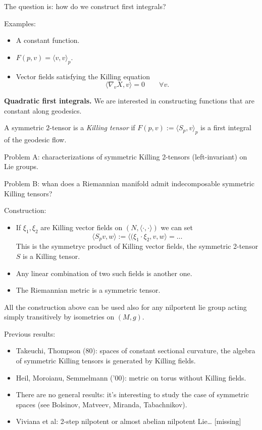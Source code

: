 \noindent
The question is: how do we construct
first integrals?

Examples:
\begin{itemize}
\item A constant function.
\item  $F(p,v)=\langle v,v\rangle_p$.
\item Vector fields satisfying the Killing
equation
$$
\langle\nabla_v X,v\rangle=0
\qquad \forall v.
$$
\end{itemize}

\medskip\noindent
{\bf Quadratic first integrals.}
We are interested in constructing functions
that are constant along geodesics.

\begin{definition}
\label{definition-killing-tensor}
A symmetric $2$-tensor is a {\it Killing
tensor} if $F(p,v):=\langle S_p,v\rangle_p$
is a first integral of the geodesic flow.
\end{definition}

\noindent
Problem A: characterizations of symmetric
Killing 2-tensors (left-invariant) on Lie
groups.

\medskip\noindent
Problem B: whan does a Riemannian manifold
admit indecomposable symmetric Killing
tensors?

\medskip\noindent
Construction:
\begin{itemize}
\item If $\xi_1,\xi_2$ are Killing vector
fields on $(N,\langle\cdot,\cdot\rangle)$
we can set
$$
\langle S_pv,w\rangle:=
\langle(\xi_1\cdot\xi_2,v,w\rangle
=…
$$
This is the symmetryc product of Killing
vector fields, the symmetric 2-tensor $S$ is
a Killing tensor.

\item Any linear combination of two such
fields is another one.

\item The Riemannian metric is a symmetric
tensor.
\end{itemize}

\medskip\noindent
All the construction above
can be used also for any
nilportent lie group acting simply
transitively by isometries on $(M,g)$.

Previous results:
\begin{itemize}
\item Takeuchi, Thompson (80):
spaces of constant sectional curvature, the
algebra of symmetric Killing tensors is
generated by Killing fields.
\item Heil, Moroianu, Semmelmann ('00):
metric on torus without Killing fields.
\item There are no general results:
it's interesting to study the case of
symmetric spaces (see Bolsinov, Matveev,
Miranda, Tabachnikov).
\item Viviana et al: 2-step nilpotent or almost abelian
nilpotent Lie… [missing]
\end{itemize}

